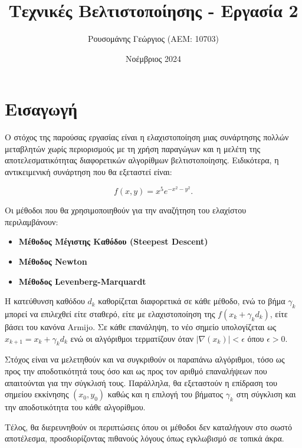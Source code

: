 \documentclass[a4paper,12pt]{article}
\title{Τεχνικές Βελτιστοποίησης - Εργασία 2}
\author{Ρουσομάνης Γεώργιος (ΑΕΜ: 10703)}
\date{Νοέμβριος 2024}
\begin{document}
\maketitle

\section*{Εισαγωγή}

Ο στόχος της παρούσας εργασίας είναι η ελαχιστοποίηση μιας συνάρτησης πολλών μεταβλητών χωρίς περιορισμούς με 
τη χρήση παραγώγων και η μελέτη της αποτελεσματικότητας διαφορετικών αλγορίθμων βελτιστοποίησης. Ειδικότερα,
η αντικειμενική συνάρτηση που θα εξεταστεί είναι:

\[
f(x, y) = x^5 e^{-x^2 - y^2}.
\]

Οι μέθοδοι που θα χρησιμοποιηθούν για την αναζήτηση του ελαχίστου περιλαμβάνουν:
\begin{itemize}
    \item \textbf{Μέθοδος Μέγιστης Καθόδου  (Steepest Descent) }
    \item \textbf{Μέθοδος  Newton}
    \item \textbf{Μέθοδος  Levenberg-Marquardt}
\end{itemize}

Η κατεύθυνση καθόδου $d_k$ καθορίζεται διαφορετικά σε κάθε μέθοδο, ενώ το βήμα $\gamma_k$ μπορεί να επιλεχθεί
είτε σταθερό, είτε με ελαχιστοποίηση της $f(x_k + \gamma_k d_k)$, είτε βάσει του κανόνα 
 Armijo. 
Σε κάθε επανάληψη, το νέο σημείο υπολογίζεται ως $x_{k+1} = x_k + \gamma_k d_k$
ενώ οι αλγόριθμοι τερματίζουν όταν $|\nabla(x_k)| < \epsilon$ όπου $\epsilon > 0$. 

Στόχος είναι να μελετηθούν και να συγκριθούν οι παραπάνω αλγόριθμοι, τόσο ως προς την αποδοτικότητά 
τους όσο και ως προς τον αριθμό επαναλήψεων που απαιτούνται για την σύγκλισή τους. Παράλληλα, 
θα εξεταστούν η επίδραση του σημείου εκκίνησης $(x_0, y_0)$ καθώς και η επιλογή του βήματος $\gamma_k$ 
στη σύγκλιση και την αποδοτικότητα του κάθε αλγορίθμου.

Τέλος, θα διερευνηθούν οι περιπτώσεις όπου οι μέθοδοι δεν καταλήγουν στο σωστό αποτέλεσμα, προσδιορίζοντας 
πιθανούς λόγους όπως εγκλωβισμό σε τοπικά άκρα.
\end{document}

